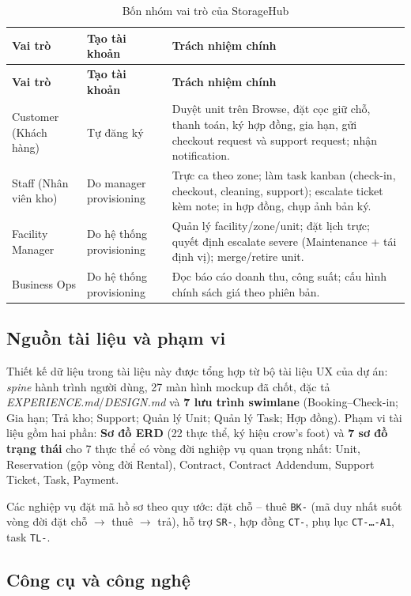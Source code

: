 \documentclass[12pt,a4paper]{article}
\renewcommand{\_}{\textunderscore\allowbreak}
\begin{document}
\begin{xltabular}{\textwidth}{|p{3.4cm}|p{2.8cm}|X|}
\caption{Bốn nhóm vai trò của StorageHub} \\
\hline
\textbf{Vai trò} & \textbf{Tạo tài khoản} & \textbf{Trách nhiệm chính} \\ \hline
\endfirsthead
\hline
\textbf{Vai trò} & \textbf{Tạo tài khoản} & \textbf{Trách nhiệm chính} \\ \hline
\endhead
Customer (Khách hàng) & Tự đăng ký & Duyệt unit trên Browse, đặt cọc giữ chỗ, thanh toán, ký hợp đồng, gia hạn, gửi checkout request và support request; nhận notification. \\ \hline
Staff (Nhân viên kho) & Do manager provisioning & Trực ca theo zone; làm task kanban (check-in, checkout, cleaning, support); escalate ticket kèm note; in hợp đồng, chụp ảnh bản ký. \\ \hline
Facility Manager & Do hệ thống provisioning & Quản lý facility/zone/unit; đặt lịch trực; quyết định escalate severe (Maintenance + tái định vị); merge/retire unit. \\ \hline
Business Ops & Do hệ thống provisioning & Đọc báo cáo doanh thu, công suất; cấu hình chính sách giá theo phiên bản. \\ \hline
\end{xltabular}

\subsection{Nguồn tài liệu và phạm vi}

Thiết kế dữ liệu trong tài liệu này được tổng hợp từ bộ tài liệu UX của dự án: \textit{spine} hành trình người dùng, 27 màn hình mockup đã chốt, đặc tả \textit{EXPERIENCE.md}/\textit{DESIGN.md} và \textbf{7 lưu trình swimlane} (Booking--Check-in; Gia hạn; Trả kho; Support; Quản lý Unit; Quản lý Task; Hợp đồng). Phạm vi tài liệu gồm hai phần: \textbf{Sơ đồ ERD} (22 thực thể, ký hiệu crow's foot) và \textbf{7 sơ đồ trạng thái} cho 7 thực thể có vòng đời nghiệp vụ quan trọng nhất: Unit, Reservation (gộp vòng đời Rental), Contract, Contract Addendum, Support Ticket, Task, Payment.

Các nghiệp vụ đặt mã hồ sơ theo quy ước: đặt chỗ -- thuê \texttt{BK-} (mã duy nhất suốt vòng đời đặt chỗ $\rightarrow$ thuê $\rightarrow$ trả), hỗ trợ \texttt{SR-}, hợp đồng \texttt{CT-}, phụ lục \texttt{CT-…-A1}, task \texttt{TL-}.

\subsection{Công cụ và công nghệ}
\end{document}
